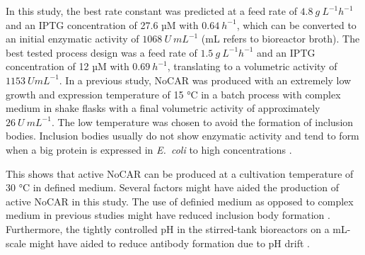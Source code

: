 \documentclass[sn-standardnature]{sn-jnl}%
\theoremstyle{thmstyleone}%
\theoremstyle{thmstyletwo}%
\theoremstyle{thmstylethree}%
\begin{document}
In this study, the best rate constant was predicted at a feed rate of $4.8\ g\ L^{-1} h^{-1}$ and an IPTG concentration of 27.6 µM with $0.64\ h^{-1}$, which can be converted to an initial enzymatic activity of $1068\ U\ mL^{-1}$ (mL refers to bioreactor broth).
The best tested process design was a feed rate of $1.5\ g\ L^{-1} h^{-1}$ and an IPTG concentration of 12 µM with $0.69\ h^{-1}$, translating to a volumetric activity of $1153\ UmL^{-1}$.
In a previous study, NoCAR was produced with an extremely low growth and expression temperature of 15 °C in a batch process with complex medium in shake flasks with a final volumetric activity of approximately $26\ U\ mL^{-1}$\cite{weber2021production}.
The low temperature was chosen to avoid the formation of inclusion bodies. Inclusion bodies usually do not show enzymatic activity and tend to form when a big protein is expressed in \textit{E.~coli} to high concentrations \cite{bhatwa2021challenges}.

This shows that active NoCAR can be produced at a cultivation temperature of 30 °C in defined medium. Several factors might have aided the production of active NoCAR in this study.
The use of definied medium as opposed to complex medium in previous studies might have reduced inclusion body formation \cite{neubauer2001expression}.
Furthermore, the tightly controlled pH in the stirred-tank bioreactors on a mL-scale might have aided to reduce antibody formation due to pH drift \cite{strandberg1991factors}.
\end{document}
